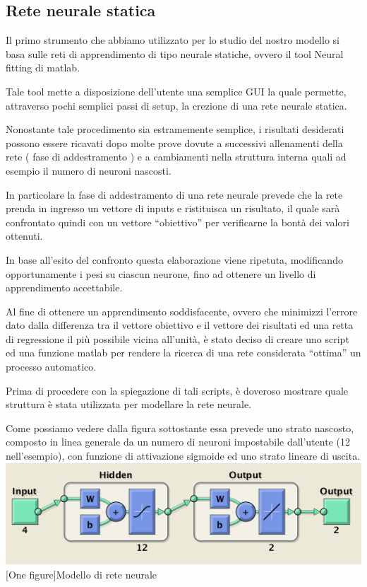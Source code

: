 \subsection{Rete neurale statica}
Il primo strumento che abbiamo utilizzato per lo studio del nostro modello si basa sulle reti di apprendimento di tipo neurale statiche, ovvero il tool Neural fitting di matlab.

Tale tool mette a disposizione dell'utente una semplice GUI la quale permette, attraverso pochi semplici passi di setup, la crezione di una rete neurale statica.

Nonostante tale procedimento sia estramemente semplice, i risultati desiderati possono essere ricavati dopo molte prove dovute a successivi allenamenti della rete ( fase di addestramento ) e a cambiamenti nella struttura interna quali ad esempio il numero di neuroni nascosti.

In particolare la fase di addestramento di una rete neurale prevede che la rete prenda in ingresso un vettore di inputs e ristituisca un risultato, il quale sarà confrontato quindi con un vettore “obiettivo” per verificarne la bontà dei valori ottenuti.

In base all’esito del confronto questa elaborazione viene ripetuta, modificando opportunamente i pesi su ciascun neurone, fino ad ottenere un livello di apprendimento accettabile.

Al fine di ottenere un apprendimento soddisfacente, ovvero che minimizzi l’errore dato dalla differenza tra il vettore obiettivo e il vettore dei risultati ed una retta di regressione il più possibile vicina all'unità, è stato deciso di creare uno script ed una funzione matlab per rendere la ricerca di una rete considerata “ottima” un processo automatico.

Prima di procedere con la spiegazione di tali scripts, è doveroso mostrare quale struttura è stata utilizzata per modellare la rete neurale.

Come possiamo vedere dalla figura sottostante essa prevede uno strato nascosto, composto in linea generale da un numero di neuroni impostabile dall'utente (12 nell'esempio), con funzione di attivazione sigmoide ed uno strato lineare di uscita.\\

\vspace{20px}
\includegraphics[scale=0.5]{images/neural_net/net.png}
[One figure]{Modello di rete neurale}
\vspace{20px}

